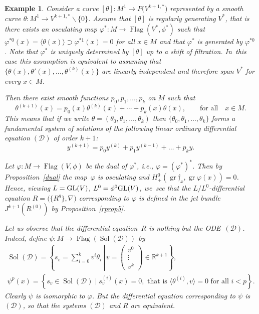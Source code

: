 \documentclass[10pt,a4paper]{amsart}
\newcommand{\R}{\mathbb R}
\newcommand{\cD}{\mathcal D}
\newcommand{\cR}{R}
\newcommand{\f}{\mathfrak f}
\newcommand{\Flag}{\operatorname{Flag}}
\newcommand{\Sol}{\operatorname{Sol}}
\newcommand{\gr}{\operatorname{gr}}
\newtheorem{ex}[thm]{Example}
\numberwithin{equation}{section}
\begin{document}
\begin{ex}\label{ex4new} Consider a curve $[\theta]\colon M^1\to P\big(V^{k+1,*}\big)$ represented by a smooth curve $\theta\colon M^1\to V^{k+1,*}\backslash \{0\}$. Assume that $[\theta]$ is regularly generating $V^*$, that is there exists an osculating map $\varphi^*\colon M\to \Flag(V^*,\phi^*)$ such that $\varphi^{*0}(x) = \langle \theta(x) \rangle\supset \varphi^{*1}(x)=0$ for all $x\in M$ and that $\varphi^*$ is generated by $\varphi^{*0}$. Note that $\varphi^*$ is uniquely determined by $[\theta]$ up to a shift of filtration. In~this case this assumption is equivalent to assuming that $\big\{\theta(x), \theta'(x),\dots, \theta^{(k)}(x)\big\}$ are linearly independent and therefore span $V^*$ for every $x\in M$.

Then there exist smooth functions $p_0,p_1,\dots,p_k$ on $M$ such that
\[
\theta^{(k+1)}(x) = p_0(x)\theta^{(k)}(x) + \cdots + p_k(x)\theta(x),\qquad \text{for all}\quad x\in M.
\]
This means that if we write $\theta=(\theta_0,\theta_1,\dots,\theta_k)$ then $\{\theta_0,\theta_1,\dots,\theta_k\}$ forms a fundamental system of solutions of the following linear ordinary differential equation $(\cD)$ of order $k+1$:
\begin{equation*}
y^{(k+1)} = p_0 y^{(k)} + p_1y^{(k-1)} + \dots + p_k y.\tag{$\cD$}
\end{equation*}

Let $\varphi\colon M\to\Flag(V,\phi)$ be the dual of $\varphi^*$, i.e., $\varphi = (\varphi^*)^*$. Then by Proposition~\ref{dual} the map~$\varphi$ is osculating and $H^0_{+}(\gr \f_x,\gr\varphi(x))=0$. Hence, viewing $L={\rm GL}(V)$, $L^0=\phi^0{\rm GL}(V)$, we~see that the $L/L^0$-differential equation $\cR=\big(\{\cR^q\},\nabla\big)$ corresponding to $\varphi$ is defined in the jet bundle $J^{k+1}(\cR^{(0)})$ by Proposition~\ref{rprop5}.

Let us observe that the differential equation~$\cR$ is nothing but the ODE~$(\cD)$. Indeed, define $\psi \colon M\to \Flag(\Sol(\cD))$ by
\begin{gather*}
\Sol(\cD) = \left\{s_v = \sum_{i=0}^k v^i\theta_i\,\left|\,v=\begin{pmatrix} v^0 \\[-1mm] \vdots \\ v^k \end{pmatrix} \in \R^{k+1}\right.\right\},
\\[.5ex]
\psi^p(x) = \left\{s_v\in \Sol(\cD)\mid s^{(i)}_v(x)=0,\text{ that is }
\big\langle \theta^{(i)},v \big\rangle = 0 \text{ for all } i<p \right\}.
\end{gather*}
Clearly $\psi$ is isomorphic to $\varphi$. But the differential equation corresponding to $\psi$ is~$(\cD)$, so that the systems $(\cD)$ and $\cR$ are equivalent.


\end{ex}
\end{document}
